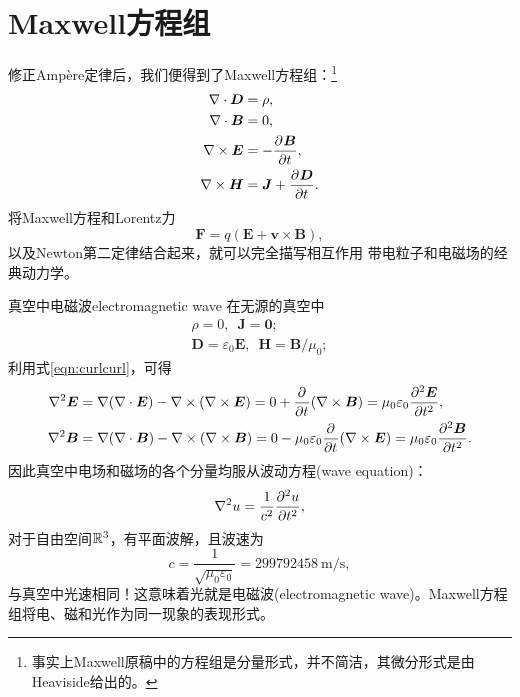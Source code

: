 \section{Maxwell方程组}
修正Ampère定律后，我们便得到了Maxwell方程组：\footnote{事实上Maxwell原稿中的方程组是分量形式，并不简洁，其微分形式是由Heaviside给出的。}
\begin{subequations}
    \begin{align}
        \label{eqn:Maxwell divD}
        \div\bm D &= \rho,\\
        \label{eqn:Maxwell divB}
        \div\bm B &= 0,\\
        \label{eqn:Maxwell curlE}
        \curl\bm E &= -\pv{\bm B}t,\\
        \label{eqn:Maxwell curlH}
        \curl\bm H &= \bm J + \pv{\bm D}t.
    \end{align}
\end{subequations}
将Maxwell方程和Lorentz力
\begin{equation}
    \label{eqn:Lorentz}
    \bm F = q(\bm E + \bm v \times \bm B),
\end{equation}
以及Newton第二定律结合起来，就可以完全描写相互作用 带电粒子和电磁场的经典动力学。
\begin{example}{真空中电磁波}{electromagnetic wave}
    在无源的真空中
    \begin{gather*}
        \rho = 0,\enspace\bm J = \bm 0;\\
        \bm D = \varepsilon_0\bm E,\enspace\bm H = \bm B/\mu_0;
    \end{gather*}
    利用式\eqref{eqn:curlcurl}，可得
    \begin{align*}
        \laplacian\bm E &= \grad(\div\bm E) - \curl(\curl\bm E) = 0 + \pp t(\curl\bm B)
        = \mu_0\varepsilon_0\pv[2]{\bm E}t,\\
        \laplacian\bm B &= \grad(\div\bm B) - \curl(\curl\bm B) = 0 - \mu_0\varepsilon_0\pp t(\curl\bm E)
        = \mu_0\varepsilon_0\pv[2]{\bm B}t.
    \end{align*}
    因此真空中电场和磁场的各个分量均服从波动方程(wave equation)：
    \begin{equation}
        \laplacian u = \frac1{c^2}\pv[2]ut,
    \end{equation}
    对于自由空间$\RR^3$，有平面波解，且波速为
    \begin{equation}
        c = \frac1{\sqrt{\mu_0\varepsilon_0}} = \qty{299 792 458}{\metre\per\second},
    \end{equation}
    与真空中光速相同！这意味着光就是电磁波(electromagnetic wave)。Maxwell方程组将电、磁和光作为同一现象的表现形式。
\end{example}

